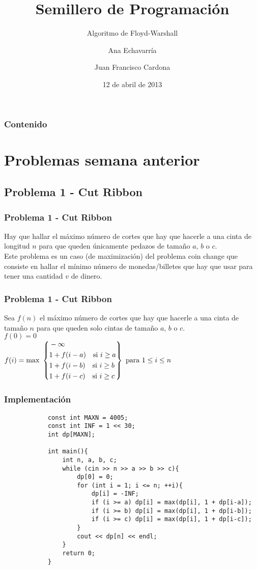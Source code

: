 \documentclass{beamer}
\title{Semillero de Programación}
\subtitle{Algoritmo de Floyd-Warshall}
\author{Ana Echavarría \and Juan Francisco Cardona}
\institute{Universidad EAFIT}
\date{12 de abril de 2013}
\begin{document}
\begin{frame}
	\titlepage
\end{frame}

\begin{frame}
	\frametitle{Contenido}
	\tableofcontents
\end{frame}

\section{Problemas semana anterior}
	\subsection{Problema 1 - Cut Ribbon}
	\begin{frame}
		\frametitle{Problema 1 - Cut Ribbon}
		Hay que hallar el máximo número de cortes que hay que hacerle a una cinta de longitud $n$ para que queden únicamente pedazos de tamaño $a$, $b$ o $c$.\\
		Este problema es un caso (de maximización) del problema coin change que consiste en hallar el mínimo número de monedas/billetes que hay que usar para tener una cantidad $v$ de dinero.\\
	\end{frame}
	
	\begin{frame}
		\frametitle{Problema 1 - Cut Ribbon}
		Sea $f(n)$ el máximo número de cortes que hay que hacerle a una cinta de tamaño $n$ para que queden solo cintas de tamaño $a$, $b$ o $c$.\\
		$f(0) = 0$ \\
		$
		f(i) =  \text{max } 
		\left\{
			\begin{aligned}
				& -\infty\\
				& 1 + f(i-a) \text{\quad si } i \geq a\\
				& 1 + f(i-b) \text{\quad si } i \geq b\\
				& 1 + f(i-c) \text{\quad si } i \geq c\\
			\end{aligned}
		\right\}
		\text{ para } 
			\begin{aligned}
				& 1 \leq i \leq n\\
			\end{aligned}
		$
	\end{frame}
	
	\begin{frame}[fragile]
		\frametitle{Implementación}
		\begin{lstlisting}
			const int MAXN = 4005;
			const int INF = 1 << 30;
			int dp[MAXN];

			int main(){
			    int n, a, b, c;
			    while (cin >> n >> a >> b >> c){
			        dp[0] = 0;
			        for (int i = 1; i <= n; ++i){
			            dp[i] = -INF;
			            if (i >= a) dp[i] = max(dp[i], 1 + dp[i-a]);
			            if (i >= b) dp[i] = max(dp[i], 1 + dp[i-b]);
			            if (i >= c) dp[i] = max(dp[i], 1 + dp[i-c]);
			        }
			        cout << dp[n] << endl;
			    }
			    return 0;
			}
		\end{lstlisting}
	\end{frame}
	
\end{document}
